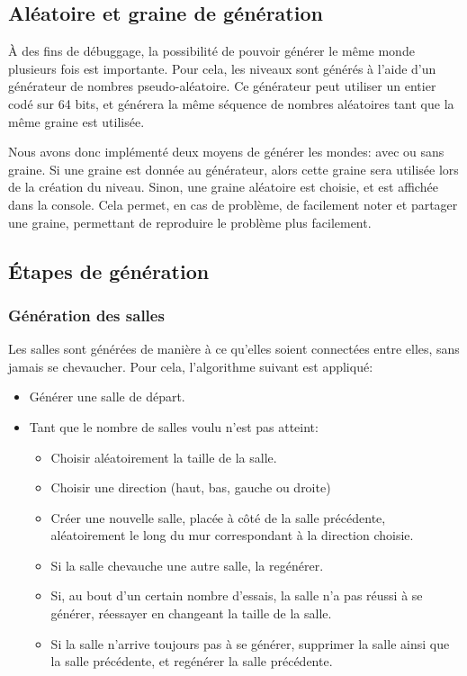 \documentclass[10pt]{report}
\begin{document}
\subsection{Aléatoire et graine de génération}

À des fins de débuggage, la possibilité de pouvoir générer le même monde plusieurs fois est importante.
Pour cela, les niveaux sont générés à l'aide d'un générateur de nombres pseudo-aléatoire.
Ce générateur peut utiliser un entier codé sur 64 bits, et générera la même séquence de nombres
aléatoires tant que la même graine est utilisée. 

Nous avons donc implémenté deux moyens de générer les mondes: avec ou sans graine.
Si une graine est donnée au générateur, alors cette graine sera utilisée lors de la création du niveau.
Sinon, une graine aléatoire est choisie, et est affichée dans la console.
Cela permet, en cas de problème, de facilement noter et partager une graine, permettant de reproduire
le problème plus facilement.

\subsection{Étapes de génération}
\subsubsection{Génération des salles}

Les salles sont générées de manière à ce qu'elles soient connectées entre
elles, sans jamais se chevaucher.
Pour cela, l'algorithme suivant est appliqué:

\begin{itemize}
  \item Générer une salle de départ.
  \item Tant que le nombre de salles voulu n'est pas atteint:
  \begin{itemize}
    \item Choisir aléatoirement la taille de la salle.
    \item Choisir une direction (haut, bas, gauche ou droite)
    \item Créer une nouvelle salle, placée à côté de la salle précédente,
    aléatoirement le long du mur correspondant à la direction choisie.
    \item Si la salle chevauche une autre salle, la regénérer.
    \item Si, au bout d'un certain nombre d'essais, la salle n'a pas réussi
    à se générer, réessayer en changeant la taille de la salle.
    \item Si la salle n'arrive toujours pas à se générer, supprimer la
    salle ainsi que la salle précédente, et regénérer la salle précédente.
  \end{itemize}
\end{itemize}
\end{document}
